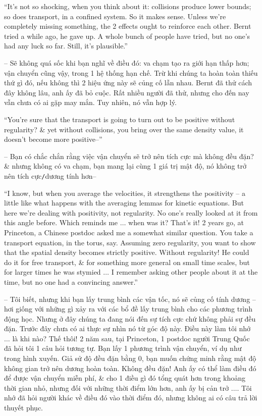\documentclass{article}
\begin{document}
\begin{enumerate}
	``It's not so shocking, when you think about it: collisions produce lower bounds; so does transport, in a confined system. So it makes sense. Unless we're completely missing something, the 2 effects ought to reinforce each other. Bernt tried a while ago, he gave up. A whole bunch of people have tried, but no one's had any luck so far. Still, it's plausible.''

	-- Sẽ không quá sốc khi bạn nghĩ về điều đó: va chạm tạo ra giới hạn thấp hơn; vận chuyển cũng vậy, trong 1 hệ thống hạn chế. Trừ khi chúng ta hoàn toàn thiếu thứ gì đó, nếu không thì 2 hiệu ứng này sẽ củng cố lẫn nhau. Bernt đã thử cách đây không lâu, anh ấy đã bỏ cuộc. Rất nhiều người đã thử, nhưng cho đến nay vẫn chưa có ai gặp may mắn. Tuy nhiên, nó vẫn hợp lý.

	``You're sure that the transport is going to turn out to be positive without regularity? \& yet without collisions, you bring over the same density value, it doesn't become more positive--''

	-- Bạn có chắc chắn rằng việc vận chuyển sẽ trở nên tích cực mà không đều đặn? \& nhưng không có va chạm, bạn mang lại cùng 1 giá trị mật độ, nó không trở nên tích cực{\tt/}dương tính hơn--

	``I know, but when you average the velocities, it strengthens the positivity -- a little like what happens with the averaging lemmas for kinetic equations. But here we're dealing with positivity, not regularity. No one's really looked at it from this angle before. Which reminds me $\ldots$ when was it? That's it! 2 years go, at Princeton, a Chinese postdoc asked me a somewhat similar question. You take a transport equation, in the torus, say. Assuming zero regularity, you want to show that the spatial density becomes strictly positive. Without regularity! He could do it for free transport, \& for something more general on small time scales, but for larger times he was stymied $\ldots$ I remember asking other people about it at the time, but no one had a convincing answer.''

	-- Tôi biết, nhưng khi bạn lấy trung bình các vận tốc, nó sẽ củng cố tính dương -- hơi giống với những gì xảy ra với các bổ đề lấy trung bình cho các phương trình động học. Nhưng ở đây chúng ta đang nói đến sự tích cực chứ không phải sự đều đặn. Trước đây chưa có ai thực sự nhìn nó từ góc độ này. Điều này làm tôi nhớ $\ldots$ là khi nào? Thế thôi! 2 năm sau, tại Princeton, 1 postdoc người Trung Quốc đã hỏi tôi 1 câu hỏi tương tự. Bạn lấy 1 phương trình vận chuyển, ví dụ như trong hình xuyến. Giả sử độ đều đặn bằng 0, bạn muốn chứng minh rằng mật độ không gian trở nên dương hoàn toàn. Không đều đặn! Anh ấy có thể làm điều đó để được vận chuyển miễn phí, \& cho 1 điều gì đó tổng quát hơn trong khoảng thời gian nhỏ, nhưng đối với những thời điểm lớn hơn, anh ấy bị cản trở $\ldots$. Tôi nhớ đã hỏi người khác về điều đó vào thời điểm đó, nhưng không ai có câu trả lời thuyết phục.


\end{enumerate}
\end{document}
